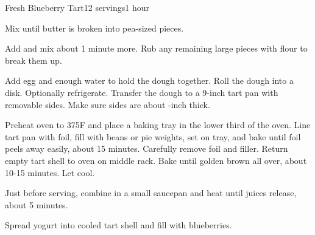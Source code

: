 \documentclass[../Cookbook.tex]{subfiles}
\begin{document}
\begin{recipe}{Fresh Blueberry Tart}{12 servings}{1 hour}

Mix until butter is broken into pea-sized pieces.

Add and mix about 1 minute more. Rub any remaining large pieces with flour to break them up.

Add egg and enough water to hold the dough together. Roll the dough into a disk. Optionally refrigerate.
Transfer the dough to a 9-inch tart pan with removable sides. Make sure sides are about -inch thick.

Preheat oven to 375\0F and place a baking tray in the lower third of the oven.
Line tart pan with foil, fill with beans or pie weights, set on tray, and bake until foil peels away easily, about 15 minutes. Carefully remove foil and filler. Return empty tart shell to oven on middle rack. Bake until golden brown all over, about 10-15 minutes. Let cool.

Just before serving, combine in a small saucepan and heat until juices release, about 5 minutes.

Spread yogurt into cooled tart shell and fill with blueberries.

\end{recipe}
\end{document}
